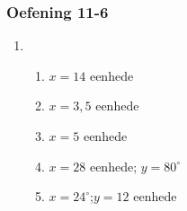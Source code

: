 {\begin{multicols}{3}
% 

\subsubsection*{Oefening 11-6} %

\begin{enumerate}[noitemsep,label=\textbf{\arabic*}.]
      \item %
	    \begin{enumerate}[noitemsep, label=\textbf{(\alph*)} ]
		\item$x=14$ eenhede
\item$x=3,5$ eenhede
\item$x=5$ eenhede
\item$x=28$ eenhede; $y=80^{\circ}$
\item$x=24^{\circ}$;$y=12$ eenhede
	    \end{enumerate}


\end{enumerate}



\end{multicols}}
